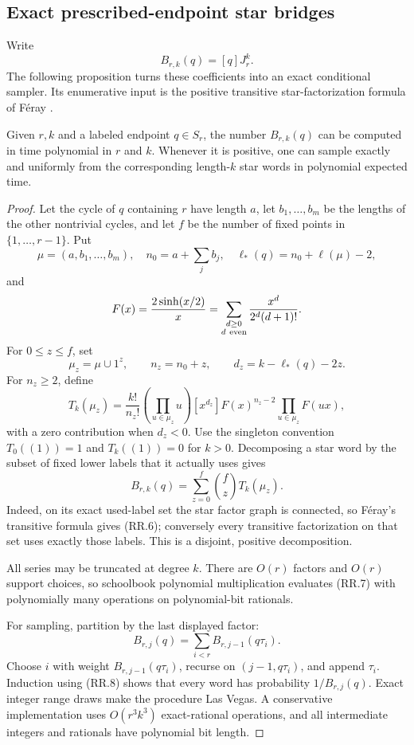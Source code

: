 \subsection{Exact prescribed-endpoint star bridges}

Write
\[
  B_{r,k}(q)=[q]J_r^k.
\]
The following proposition turns these coefficients into an exact conditional
sampler.  Its enumerative input is the positive transitive
star-factorization formula of F\'eray \cite[Proposition 1.1, Theorem 1.2, and
Lemma 3.1]{Feray2012}.

\begin{proposition}
\label{prop:star-completion}
Given $r,k$ and a labeled endpoint $q\in S_r$, the number $B_{r,k}(q)$ can be
computed in time polynomial in $r$ and $k$.  Whenever it is positive, one can
sample exactly and uniformly from the corresponding length-$k$ star words in
polynomial expected time.
\end{proposition}

\begin{proof}
Let the cycle of $q$ containing $r$ have length $a$, let
$b_1,\ldots,b_m$ be the lengths of the other nontrivial cycles, and let $f$
be the number of fixed points in $\{1,\ldots,r-1\}$.  Put
\[
  \mu=(a,b_1,\ldots,b_m),\quad
  n_0=a+\sum_jb_j,\quad
  \ell_*(q)=n_0+\ell(\mu)-2,
\]
and
\[
  F(x)=\frac{2\sinh(x/2)}{x}
      =\sum_{\substack{d\ge0\\d\ {\rm even}}}
        \frac{x^d}{2^d(d+1)!}.
\]
For $0\le z\le f$, set
\[
  \mu_z=\mu\cup 1^z,\qquad n_z=n_0+z,\qquad
  d_z=k-\ell_*(q)-2z.
\]
For $n_z\ge2$, define
\[
  T_k(\mu_z)
  =
  \frac{k!}{n_z!}
  \left(\prod_{u\in\mu_z}u\right)
  [x^{d_z}]F(x)^{n_z-2}\prod_{u\in\mu_z}F(ux),
  \tag{RR.6}
\]
with a zero contribution when $d_z<0$.  Use the singleton convention
$T_0((1))=1$ and $T_k((1))=0$ for $k>0$.  Decomposing a star word by the
subset of fixed lower labels that it actually uses gives
\[
  B_{r,k}(q)=\sum_{z=0}^f\binom{f}{z}T_k(\mu_z).
  \tag{RR.7}
\]
Indeed, on its exact used-label set the star factor graph is connected, so
F\'eray's transitive formula gives (RR.6); conversely every transitive
factorization on that set uses exactly those labels.  This is a disjoint,
positive decomposition.

All series may be truncated at degree $k$.  There are $O(r)$ factors and
$O(r)$ support choices, so schoolbook polynomial multiplication evaluates
(RR.7) with polynomially many operations on polynomial-bit rationals.

For sampling, partition by the last displayed factor:
\[
  B_{r,j}(q)=\sum_{i<r}B_{r,j-1}(q\tau_i).
  \tag{RR.8}
\]
Choose $i$ with weight $B_{r,j-1}(q\tau_i)$, recurse on
$(j-1,q\tau_i)$, and append $\tau_i$.  Induction using (RR.8) shows that
every word has probability $1/B_{r,j}(q)$.  Exact integer range draws make
the procedure Las Vegas.  A conservative implementation uses
$O(r^3k^3)$ exact-rational operations, and all intermediate integers and
rationals have polynomial bit length.
\end{proof}

